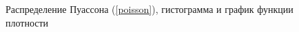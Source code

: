 \documentclass[12pt,a4paper]{article}
\begin{document}
\begin{figure}[h!]
\begin{minipage}[h]{0.3\linewidth}
		\end{minipage}
		\caption{Распределение Пуассона (\ref{poisson}), гистограмма и график функции плотности}
		\label{ris:poisson}
	\end{figure}
	\newpage
\end{document}
